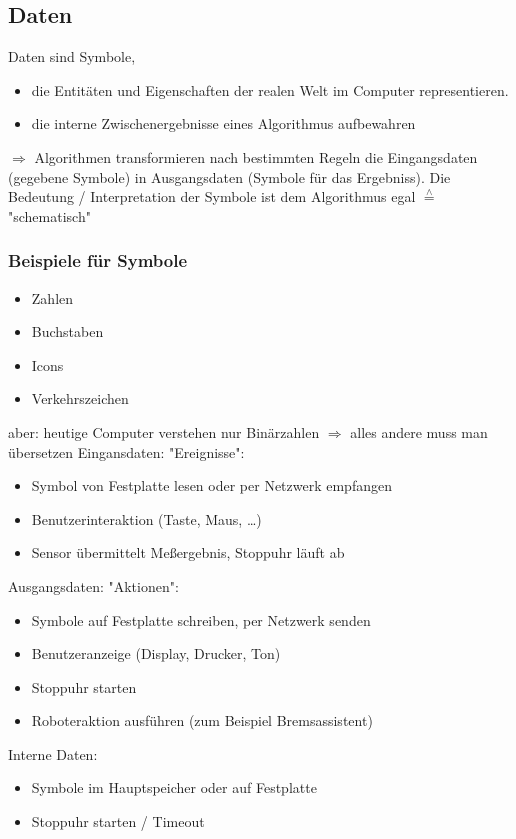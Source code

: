 \documentclass[a4paper]{scrartcl}
\newcommand{\estimates}{\overset{\scriptscriptstyle\wedge}{=}}%
\begin{document}
\subsection{Daten}
\label{sec-5-2}
Daten sind Symbole,
\begin{itemize}
\item die Entitäten und Eigenschaften der realen Welt im Computer representieren.
\item die interne Zwischenergebnisse eines Algorithmus aufbewahren
\end{itemize}
$\Rightarrow$ Algorithmen transformieren nach bestimmten Regeln die Eingangsdaten (gegebene Symbole) in Ausgangsdaten (Symbole für das Ergebniss).
Die Bedeutung / Interpretation der Symbole ist dem Algorithmus egal $\estimates$ "schematisch"
\subsubsection{Beispiele für Symbole}
\label{sec-5-2-1}
\begin{itemize}
\item Zahlen
\item Buchstaben
\item Icons
\item Verkehrszeichen
\end{itemize}
aber: heutige Computer verstehen nur Binärzahlen $\Rightarrow$ alles andere muss man übersetzen
Eingansdaten: "Ereignisse":
\begin{itemize}
\item Symbol von Festplatte lesen oder per Netzwerk empfangen
\item Benutzerinteraktion (Taste, Maus, \ldots{})
\item Sensor übermittelt Meßergebnis, Stoppuhr läuft ab
\end{itemize}
Ausgangsdaten: "Aktionen":
\begin{itemize}
\item Symbole auf Festplatte schreiben, per Netzwerk senden
\item Benutzeranzeige (Display, Drucker, Ton)
\item Stoppuhr starten
\item Roboteraktion ausführen (zum Beispiel Bremsassistent)
\end{itemize}
Interne Daten:
\begin{itemize}
\item Symbole im Hauptspeicher oder auf Festplatte
\item Stoppuhr starten / Timeout
\end{itemize}
\end{document}
